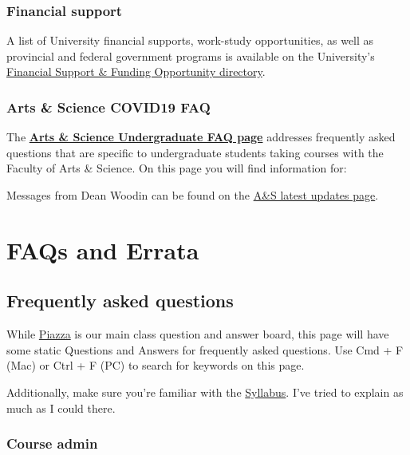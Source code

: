 \documentclass[
  openany]{book}
\begin{document}
\hypertarget{financial-support}{%
\subsection{Financial support}\label{financial-support}}

A list of University financial supports, work-study opportunities, as well as provincial and federal government programs is available on the University's \href{https://www.viceprovoststudents.utoronto.ca/covid-19/funding-opportunity-directory/}{Financial Support \& Funding Opportunity directory}.

\hypertarget{arts-science-covid19-faq}{%
\subsection{Arts \& Science COVID19 FAQ}\label{arts-science-covid19-faq}}

The \href{https://www.artsci.utoronto.ca/covid19-artsci-student-faqs}{\textbf{Arts \& Science Undergraduate FAQ page}} addresses frequently asked questions that are specific to undergraduate students taking courses with the Faculty of Arts \& Science. On this page you will find information for:

Messages from Dean Woodin can be found on the \href{https://www.artsci.utoronto.ca/news/covid-19-and-u-ts-response-latest-updates-and-faqs}{A\&S latest updates page}.

\hypertarget{faqs-and-errata}{%
\chapter{FAQs and Errata}\label{faqs-and-errata}}

\hypertarget{frequently-asked-questions}{%
\section{Frequently asked questions}\label{frequently-asked-questions}}

While \href{\%60r\%20piazza\%60}{Piazza} is our main class question and answer board, this page will have some static Questions and Answers for frequently asked questions. Use Cmd + F (Mac) or Ctrl + F (PC) to search for keywords on this page.

Additionally, make sure you're familiar with the \protect\hyperlink{syllabus}{Syllabus}. I've tried to explain as much as I could there.

\hypertarget{course-admin}{%
\subsection{Course admin}\label{course-admin}}
\end{document}
